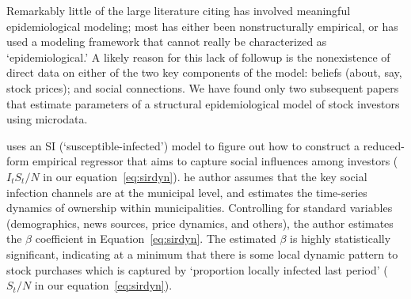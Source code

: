 Remarkably little of the large literature citing \cite{shiller1989survey} has involved meaningful epidemiological modeling; most has either been nonstructurally empirical, or has used a modeling framework that cannot really be characterized as `epidemiological.'
A likely reason for this lack of followup is the nonexistence of direct data on either of the two key components of the model: beliefs (about, say, stock prices); and social connections.   We have found only two subsequent papers that estimate parameters of a structural epidemiological model of stock investors using microdata.

 uses an SI (`susceptible-infected') model to figure out how to construct a reduced-form empirical regressor that aims to capture social influences among investors ($I_tS_t/N$ in our equation~\eqref{eq:sirdyn}). he author assumes that the key social infection channels are at the municipal level, and estimates the time-series dynamics of ownership within municipalities.  Controlling for standard variables (demographics, news sources, price dynamics, and others), the author estimates the $\beta$ coefficient in Equation~\eqref{eq:sirdyn}.  The estimated $\beta$ is highly statistically significant, indicating at a minimum that there is some local dynamic pattern to stock purchases which is captured by `proportion locally infected last period' ($S_t/N$ in our equation~\eqref{eq:sirdyn}).

